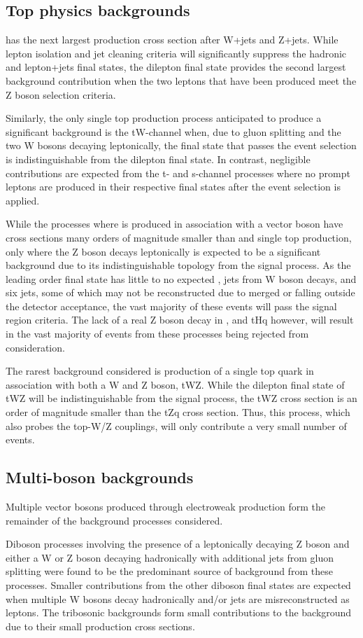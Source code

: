 \subsection{Top physics backgrounds}
\ttbar has the next largest production cross section after W+jets and Z+jets.
While lepton isolation and jet cleaning criteria will significantly suppress the hadronic and lepton+jets final states, the dilepton final state provides the second largest background contribution when the two leptons that have been produced meet the Z boson selection criteria.

Similarly, the only single top production process anticipated to produce a significant background is the tW-channel when, due to gluon splitting and the two W bosons decaying leptonically, the final state that passes the event selection is indistinguishable from the \ttbar dilepton final state.
In contrast, negligible contributions are expected from the t- and s-channel processes
where no prompt leptons are produced in their respective final states after the event selection is applied.

While the processes where \ttbar is produced in association with a vector boson have cross sections many orders of magnitude smaller than \ttbar and single top production, only \ttbarZ where the Z boson decays leptonically is expected to be a significant background due to its indistinguishable topology from the signal process.
As the leading order final state has little to no expected \MET, jets from W boson decays, and six jets,
some of which may not be reconstructed due to merged or falling outside the detector acceptance, the vast majority of these events will pass the signal region criteria.
The lack of a real Z boson decay in \ttbarW, \ttbarH and tHq however, will result in the vast majority of events from these processes being rejected from consideration.

The rarest background considered is production of a single top quark in association with both a W and Z boson, tWZ.
While the dilepton final state of tWZ will be indistinguishable from the signal process, the tWZ cross section is an order of magnitude smaller than the tZq cross section.
Thus, this process, which also probes the top-W/Z couplings, will only contribute a very small number of events.

\subsection{Multi-boson backgrounds}
Multiple vector bosons produced through electroweak production form the remainder of the background processes considered.

Diboson processes involving the presence of a leptonically decaying Z boson and either a W or Z boson decaying hadronically with additional jets from gluon splitting were found to be the predominant source of background from these processes.
Smaller contributions from the other diboson final states are expected when multiple W bosons decay hadronically and/or jets are misreconstructed as leptons.
The tribosonic backgrounds form small contributions to the background due to their small production cross sections.